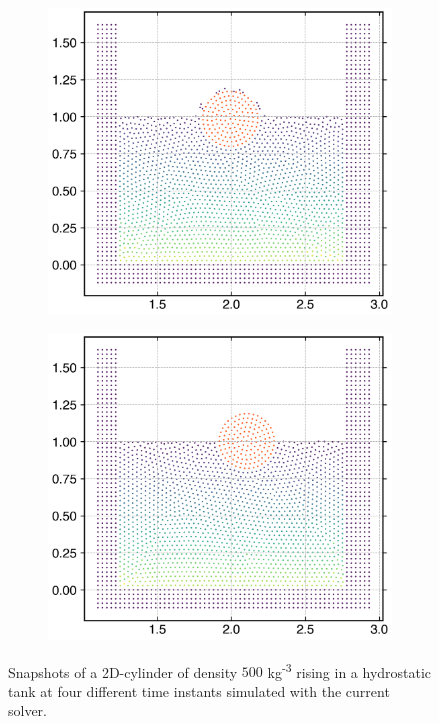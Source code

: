 \begin{figure}[!htpb]
  \begin{subfigure}{0.48\textwidth}
    \centering
    \includegraphics[width=1.0\textwidth]{figures/rfc/figures/dinesh_2022_body_in_hs_tank_2d/time6}
  \end{subfigure}
  \begin{subfigure}{0.48\textwidth}
    \centering
    \includegraphics[width=1.0\textwidth]{figures/rfc/figures/dinesh_2022_body_in_hs_tank_2d/time11}
  \end{subfigure}
  \caption{Snapshots of a 2D-cylinder of density $500$ kg\textsuperscript{-3}
    rising in a hydrostatic tank at four different time instants simulated
    with the current solver.}
\label{fig:snapshots-rising-solid-in-water}
\end{figure}

